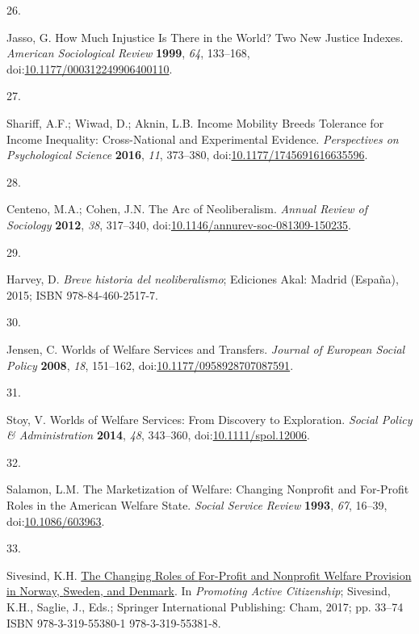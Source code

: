 \documentclass[
  12pt,
  letterpaper,
]{article}
\newlength{\cslhangindent}
\newlength{\csllabelwidth}
\newenvironment{CSLReferences}[2] %
 {\begin{list}{}{%
  \setlength{\itemindent}{0pt}
  \setlength{\leftmargin}{0pt}
  \setlength{\parsep}{0pt}
  \ifodd #1
   \setlength{\leftmargin}{\cslhangindent}
   \setlength{\itemindent}{-1\cslhangindent}
  \fi
  \setlength{\itemsep}{#2\baselineskip}}}
 {\end{list}}
\newcommand{\CSLLeftMargin}[1]{\parbox[t]{\csllabelwidth}{\strut#1\strut}}
\newcommand{\CSLRightInline}[1]{\parbox[t]{\linewidth - \csllabelwidth}{\strut#1\strut}}
\begin{document}
\begin{CSLReferences}{0}{0}
\CSLLeftMargin{26. }%
\CSLRightInline{Jasso, G. How {Much Injustice} Is {There} in the
{World}? {Two New Justice Indexes}. \emph{American Sociological Review}
\textbf{1999}, \emph{64}, 133--168,
doi:\href{https://doi.org/10.1177/000312249906400110}{10.1177/000312249906400110}.}

\CSLLeftMargin{27. }%
\CSLRightInline{Shariff, A.F.; Wiwad, D.; Aknin, L.B. Income {Mobility
Breeds Tolerance} for {Income Inequality}: {Cross-National} and
{Experimental Evidence}. \emph{Perspectives on Psychological Science}
\textbf{2016}, \emph{11}, 373--380,
doi:\href{https://doi.org/10.1177/1745691616635596}{10.1177/1745691616635596}.}

\CSLLeftMargin{28. }%
\CSLRightInline{Centeno, M.A.; Cohen, J.N. The {Arc} of {Neoliberalism}.
\emph{Annual Review of Sociology} \textbf{2012}, \emph{38}, 317--340,
doi:\href{https://doi.org/10.1146/annurev-soc-081309-150235}{10.1146/annurev-soc-081309-150235}.}

\CSLLeftMargin{29. }%
\CSLRightInline{Harvey, D. \emph{{Breve historia del neoliberalismo}};
Ediciones Akal: Madrid (Espa{ñ}a), 2015; ISBN 978-84-460-2517-7.}

\CSLLeftMargin{30. }%
\CSLRightInline{Jensen, C. Worlds of Welfare Services and Transfers.
\emph{Journal of European Social Policy} \textbf{2008}, \emph{18},
151--162,
doi:\href{https://doi.org/10.1177/0958928707087591}{10.1177/0958928707087591}.}

\CSLLeftMargin{31. }%
\CSLRightInline{Stoy, V. Worlds of {Welfare Services}: {From Discovery}
to {Exploration}. \emph{Social Policy \& Administration} \textbf{2014},
\emph{48}, 343--360,
doi:\href{https://doi.org/10.1111/spol.12006}{10.1111/spol.12006}.}

\CSLLeftMargin{32. }%
\CSLRightInline{Salamon, L.M. The {Marketization} of {Welfare}:
{Changing Nonprofit} and {For-Profit Roles} in the {American Welfare
State}. \emph{Social Service Review} \textbf{1993}, \emph{67}, 16--39,
doi:\href{https://doi.org/10.1086/603963}{10.1086/603963}.}

\CSLLeftMargin{33. }%
\CSLRightInline{Sivesind, K.H.
\href{https://doi.org/10.1007/978-3-319-55381-8_2}{The {Changing Roles}
of {For-Profit} and {Nonprofit Welfare Provision} in {Norway}, {Sweden},
and {Denmark}}. In \emph{Promoting {Active Citizenship}}; Sivesind,
K.H., Saglie, J., Eds.; Springer International Publishing: Cham, 2017;
pp. 33--74 ISBN 978-3-319-55380-1 978-3-319-55381-8.}


\end{CSLReferences}
\end{document}
